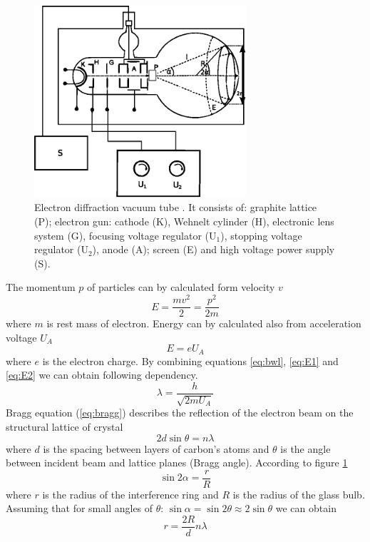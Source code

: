 \documentclass[a4paper,12pt]{article}
\begin{document}
\begin{figure}[h]
\begin{center}
    \includegraphics[width=0.7\textwidth]{tube}
    \caption{Electron diffraction vacuum tube \cite{E21}. It consists of: graphite lattice (P); electron gun: cathode (K), Wehnelt cylinder (H), electronic lens system (G), focusing voltage regulator (U$_{1}$), stopping voltage regulator (U$_{2}$), anode (A); screen (E) and high voltage power supply (S).}
    \label{fig:tube}
\end{center}
\end{figure}

The momentum $p$ of particles can by calculated form velocity $v$
\begin{equation}
    E = \frac{mv^2}{2} = \frac{p^2}{2m} \label{eq:E1}
\end{equation}
where $m$ is rest mass of electron. Energy can by calculated also from acceleration voltage $U_A$
\begin{equation}
    E = eU_A \label{eq:E2}
\end{equation}
where $e$ is the electron charge. By combining equations \ref{eq:bwl}, \ref{eq:E1} and \ref{eq:E2} we can obtain following dependency.
\begin{equation}
    \lambda = \frac{h}{\sqrt{2mU_A}}  \label{eq:bwl2}
\end{equation}
Bragg equation (\ref{eq:bragg}) describes the reflection of the electron beam on the structural lattice of crystal
\begin{equation}
    2d\sin\theta = n\lambda  \label{eq:bragg}
\end{equation}
where $d$ is the spacing between layers of carbon's atoms and $\theta$ is the angle between incident beam and lattice planes (Bragg angle).
According to figure \ref{fig:tube}
\begin{equation}
    \sin 2\alpha = \frac{r}{R} \label{eq:ang1}
\end{equation}
where $r$ is the radius of the interference ring and $R$ is the radius of the glass bulb.
Assuming that for small angles of $\theta$: $\sin \alpha = \sin 2 \theta \approx 2 \sin \theta$ we can obtain
\begin{equation}
    r = \frac{2R}{d} n \lambda
\end{equation}
\end{document}

